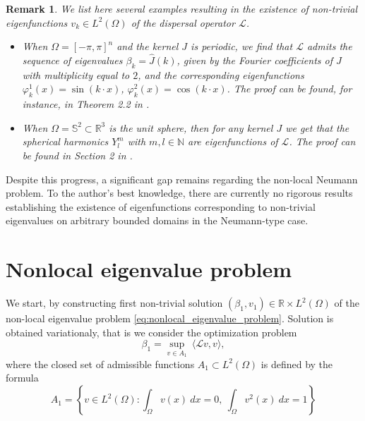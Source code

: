 \documentclass[11pt, a4paper]{article}
\theoremstyle{break}
\theoremstyle{break}
\theoremstyle{break}
\theoremstyle{break}
\newtheorem{rem}{Remark}[section]
\theoremstyle{break}
\theoremstyle{break}
\theoremstyle{break}
\theoremstyle{break}
\theoremstyle{break}
\theoremstyle{break}
\begin{document}
\begin{rem}
    \label{rem:examples}
    We list here several examples resulting in the existence of non-trivial eigenfunctions $v_k \in L^2(\Omega)$ of the dispersal operator $\mathcal{L}$.
    \begin{itemize}
        \item When $\Omega = [-\pi, \pi]^n$ and the kernel $J$ is periodic, we find that $\mathcal{L}$ admits the sequence of eigenvalues $\beta_k = \hat{J}(k)$, given by the Fourier coefficients of $J$ with multiplicity equal to $2$, and the corresponding eigenfunctions $\varphi_k^1(x) = \sin(k\cdot x)$, $\varphi_k^2(x) = \cos(k\cdot x)$. The proof can be found, for instance, in Theorem 2.2 in \cite{Tadej2025}.
        \item When $\Omega = \mathbb{S}^2 \subset \mathbb{R}^3$ is the unit sphere, then for any kernel $J$ we get that the spherical harmonics $Y^m_l$ with $m, l \in \mathbb{N}$ are eigenfunctions of $\mathcal{L}$. The proof can be found in Section 2 in \cite{SlevinskyMontanelli2018}.
    \end{itemize}
\end{rem}

Despite this progress, a significant gap remains regarding the non-local Neumann problem. To the author's best knowledge, there are currently no rigorous results establishing the existence of eigenfunctions corresponding to non-trivial eigenvalues on arbitrary bounded domains in the Neumann-type case.

\section{Nonlocal eigenvalue problem}

We start, by constructing first non-trivial solution $(\beta_1, v_1) \in \mathbb{R} \times L^2(\Omega)$ of the non-local eigenvalue problem \eqref{eq:nonlocal_eigenvalue_problem}. Solution is obtained variationaly, that is we consider the optimization problem
\begin{equation}
    \label{eq:eigenvalue_problem_1}
    \beta_1 = \sup_{v \in A_1} \: \langle \mathcal L v, v \rangle,
\end{equation}
where the closed set of admissible functions $A_1 \subset L^2(\Omega)$ is defined by the formula
\begin{equation}
    \label{eq:A_set_Def}
    A_1 = \left\{ v \in L^2(\Omega) : \int_\Omega v(x) \:dx = 0, \: \int_\Omega v^2(x) \:dx = 1 \right\}
\end{equation}
\end{document}
